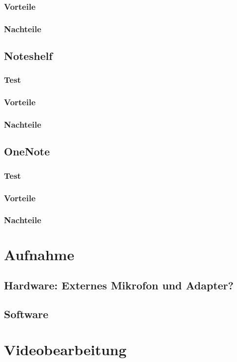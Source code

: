 \documentclass[parskip=off,index=totocnumbered]{scrreprt}
\begin{document}
\subsection{Vorteile}
\subsection{Nachteile}

\section{Noteshelf}
\subsection{Test}
\subsection{Vorteile}
\subsection{Nachteile}

\section{OneNote}
\subsection{Test}
\subsection{Vorteile}
\subsection{Nachteile}

\chapter{Aufnahme}
\section{Hardware: Externes Mikrofon und Adapter?}
\section{Software}

\chapter{Videobearbeitung}
\end{document}
